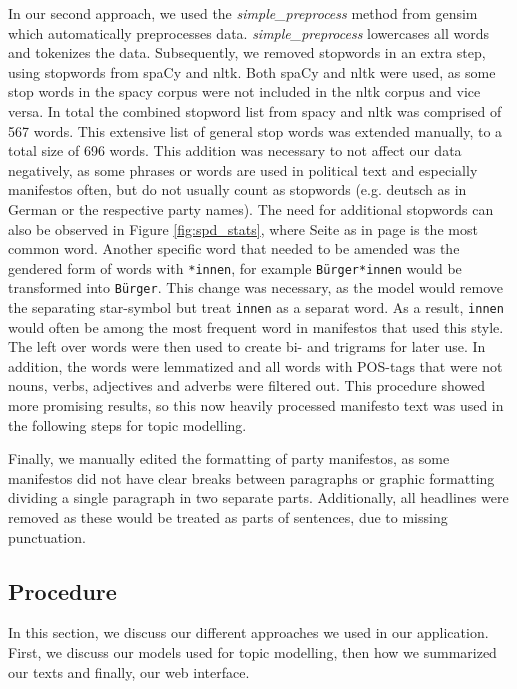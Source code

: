In our second approach, we used the \textit{simple\_preprocess} method from gensim which automatically preprocesses data. \textit{simple\_preprocess} lowercases all words and tokenizes the data. Subsequently, we removed stopwords in an extra step, using stopwords from spaCy and nltk. Both spaCy and nltk were used, as some stop words in the spacy corpus were not included in the nltk corpus and vice versa. In total the combined stopword list from spacy and nltk was comprised of 567 words. This extensive list of general stop words was extended manually, to a total size of 696 words. This addition was necessary to not affect our data negatively, as some phrases or words are used in political text and especially manifestos often, but do not usually count as stopwords (e.g. \glqq deutsch\grqq{} as in German or the respective party names). The need for additional stopwords can also be observed in Figure \ref{fig:spd_stats}, where \glqq Seite\grqq{} as in page is the most common word. Another specific word that needed to be amended was the gendered form of words with \glqq\texttt{*innen}\grqq{}, for example \glqq\texttt{Bürger*innen}\grqq{} would be transformed into \glqq\texttt{Bürger}\grqq{}. This change was necessary, as the model would remove the separating star-symbol but treat \glqq\texttt{innen}\grqq{} as a separat word. As a result, \glqq\texttt{innen}\grqq{} would often be among the most frequent word in manifestos that used this style. The left over words were then used to create bi- and trigrams for later use. In addition, the words were lemmatized and all words with POS-tags that were not nouns, verbs, adjectives and adverbs were filtered out. This procedure showed more promising results, so this now heavily processed manifesto text was used in the following steps for topic modelling.

Finally, we manually edited the formatting of party manifestos, as some manifestos did not have clear breaks between paragraphs or graphic formatting dividing a single paragraph in two separate parts. Additionally, all headlines were removed as these would be treated as parts of sentences, due to missing punctuation.

\subsection{Procedure}
In this section, we discuss our different approaches we used in our application. First, we discuss our models used for topic modelling, then how we summarized our texts and finally, our web interface.
